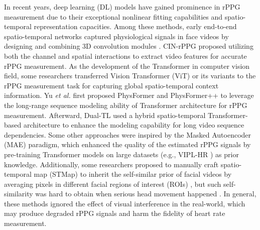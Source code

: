 In recent years, deep learning (DL) models have gained prominence in rPPG measurement due to their exceptional nonlinear fitting capabilities and spatio-temporal representation capacities. Among these methods, early end-to-end spatio-temporal networks captured physiological signals in face videos by designing and combining 3D convolution modules \cite{liu2020Deeprppg, CINrPPG2023}. CIN-rPPG \cite{CINrPPG2023} proposed utilizing both the channel and spatial interactions to extract video features for accurate rPPG measurement. As the development of the Transformer in computer vision field, some researchers transferred Vision Transformer (ViT) \cite{AlexeyViT2021} or its variants \cite{LiuSwin2021} to the rPPG measurement task for capturing global spatio-temporal context information. Yu \textit{et al.} first proposed PhysFormer \cite{YuPhysFormer2022} and PhysFormer++ \cite{YuPhysformer++2023} to leverage the long-range sequence modeling ability of Transformer architecture for rPPG measurement. Afterward, Dual-TL \cite{Dual-TL2024} used a hybrid spatio-temporal Transformer-based architecture to enhance the modeling capability for long video sequence dependencies. Some other approaches \cite{shao2023tranphys, LiurPPGMAE2023} were inspired by the Masked Autoencoder (MAE) \cite{HeMAE2022} paradigm, which enhanced the quality of the estimated rPPG signals by pre-training Transformer models on large datasets (e.g., VIPL-HR \cite{NiuVIPL2018}) as prior knowledge. Additionally, some researchers proposed to manually craft spatio-temporal map (STMap) to inherit the self-similar prior of facial videos by averaging pixels in different facial regions of interest (ROIs) \cite{NiuRhythm2020,NiuCVD2020}, but such self-similarity was hard to obtain when serious head movement happened \cite{LiurPPGMAE2023}. In general, these methods ignored the effect of visual interference in the real-world, which may produce degraded rPPG signals and harm the fidelity of heart rate measurement.

